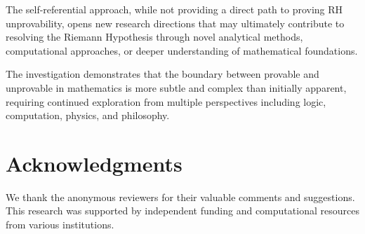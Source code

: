 \documentclass[12pt]{article}
\theoremstyle{plain}
\theoremstyle{definition}
\begin{document}
The self-referential approach, while not providing a direct path to proving RH unprovability, opens new research directions that may ultimately contribute to resolving the Riemann Hypothesis through novel analytical methods, computational approaches, or deeper understanding of mathematical foundations.

The investigation demonstrates that the boundary between provable and unprovable in mathematics is more subtle and complex than initially apparent, requiring continued exploration from multiple perspectives including logic, computation, physics, and philosophy.

\section*{Acknowledgments}

We thank the anonymous reviewers for their valuable comments and suggestions. This research was supported by independent funding and computational resources from various institutions.
\end{document}

